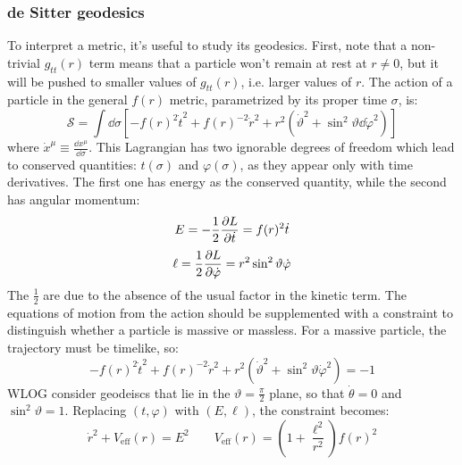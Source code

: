 \subsubsection{de Sitter geodesics}

To interpret a metric, it's useful to study its geodesics. First, note that a non-trivial $ g_{tt}(r) $ term means that a particle won't remain at rest at $ r \neq 0 $, but it will be pushed to smaller values of $ g_{tt}(r) $, i.e. larger values of $ r $. The action of a particle in the general $ f(r) $ metric, parametrized by its proper time $ \sigma $, is:
\begin{equation}
  \mathcal{S} = \int \dd \sigma \left[ - f(r)^2 \dot{t}^2 + f(r)^{-2} \dot{r}^2 + r^2 (\dot{\vartheta}^2 + \sin^2 \vartheta \dd \dot{\varphi}^2) \right]
  \label{eq:dS-action}
\end{equation}
where $ \dot{x}^\mu \equiv \frac{\dd x^\mu}{\dd \sigma} $. This Lagrangian has two ignorable degrees of freedom which lead to conserved quantities: $ t(\sigma) $ and $ \varphi(\sigma) $, as they appear only with time derivatives. The first one has energy as the conserved quantity, while the second has angular momentum:
\begin{equation}
  E = - \frac{1}{2} \frac{\partial L}{\partial \dot{t}} = f(r)^2 \dot{t}
  \label{eq:dS-energy}
\end{equation}
\begin{equation}
  \ell = \frac{1}{2} \frac{\partial L}{\partial \dot{\varphi}} = r^2 \sin^2 \vartheta \dot{\varphi}
  \label{eq:dS-ang-mom}
\end{equation}
The $ \frac{1}{2} $ are due to the absence of the usual factor in the kinetic term. The equations of motion from the action  should be supplemented with a constraint to distinguish whether a particle is massive or massless. For a massive particle, the trajectory must be timelike, so:
\begin{equation*}
  - f(r)^2 \dot{t}^2 + f(r)^{-2} \dot{r}^2 + r^2 (\dot{\vartheta}^2 + \sin^2 \vartheta \dot{\varphi}^2) = -1
\end{equation*}
WLOG consider geodeiscs that lie in the $ \vartheta = \frac{\pi}{2} $ plane, so that $ \dot{\theta} = 0 $ and $ \sin^2 \vartheta = 1 $. Replacing $ (t,\varphi) $ with $ (E,\ell) $, the constraint becomes:
\begin{equation}
  \dot{r}^2 + V_{\text{eff}}(r) = E^2
  \qquad
  V_{\text{eff}}(r) = \left( 1 + \frac{\ell^2}{r^2} \right) f(r)^2
\end{equation}

